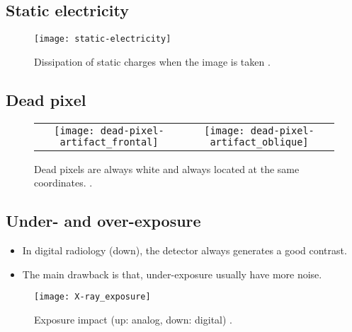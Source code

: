 \subsection*{Static electricity}
\vspace{-1ex}
\begin{figure}[H]
  \centering
  \texttt{[image: static-electricity]}
  \caption{Dissipation of static charges when the image is taken \cite{radiopaedia}.\label{fig:static_electricity}}
\end{figure}

\newpage
\subsection*{Dead pixel}
\vspace{-1ex}
\begin{figure}[H]
  \centering
  \begin{tabular}{cc}
    \texttt{[image: dead-pixel-artifact\_frontal]} &
                                                               \texttt{[image: dead-pixel-artifact\_oblique]}
  \end{tabular}                                                
  \caption{Dead pixels are always white and always located at the same coordinates. \cite{radiopaedia}.\label{fig:dead_pixel}}
\end{figure}

\newpage
\subsection*{Under- and over-exposure}
\begin{itemize}
\item In digital radiology (down), the detector always generates a good contrast.
\item The main drawback is that, under-exposure usually have more noise.
\end{itemize}
\vspace{-1ex}
\begin{figure}[H]
  \centering
    \texttt{[image: X-ray\_exposure]}
    \caption{Exposure impact (up: analog, down: digital)
      \cite{VELDKAMP2009209}.\label{fig:exposure}}
\end{figure}

